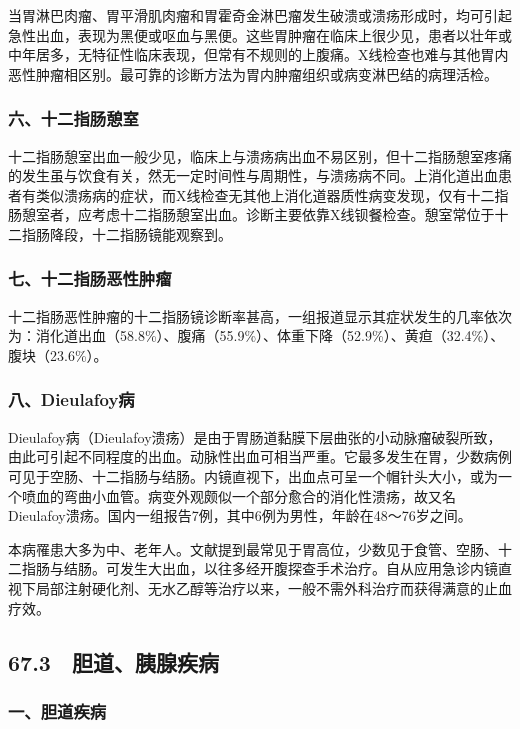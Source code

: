 当胃淋巴肉瘤、胃平滑肌肉瘤和胃霍奇金淋巴瘤发生破溃或溃疡形成时，均可引起急性出血，表现为黑便或呕血与黑便。这些胃肿瘤在临床上很少见，患者以壮年或中年居多，无特征性临床表现，但常有不规则的上腹痛。X线检查也难与其他胃内恶性肿瘤相区别。最可靠的诊断方法为胃内肿瘤组织或病变淋巴结的病理活检。

\subsubsection{六、十二指肠憩室}

十二指肠憩室出血一般少见，临床上与溃疡病出血不易区别，但十二指肠憩室疼痛的发生虽与饮食有关，然无一定时间性与周期性，与溃疡病不同。上消化道出血患者有类似溃疡病的症状，而X线检查无其他上消化道器质性病变发现，仅有十二指肠憩室者，应考虑十二指肠憩室出血。诊断主要依靠X线钡餐检查。憩室常位于十二指肠降段，十二指肠镜能观察到。

\subsubsection{七、十二指肠恶性肿瘤}

十二指肠恶性肿瘤的十二指肠镜诊断率甚高，一组报道显示其症状发生的几率依次为：消化道出血（58.8\%）、腹痛（55.9\%）、体重下降（52.9\%）、黄疸（32.4\%）、腹块（23.6\%）。

\subsubsection{八、Dieulafoy病}

Dieulafoy病（Dieulafoy溃疡）是由于胃肠道黏膜下层曲张的小动脉瘤破裂所致，由此可引起不同程度的出血。动脉性出血可相当严重。它最多发生在胃，少数病例可见于空肠、十二指肠与结肠。内镜直视下，出血点可呈一个帽针头大小，或为一个喷血的弯曲小血管。病变外观颇似一个部分愈合的消化性溃疡，故又名Dieulafoy溃疡。国内一组报告7例，其中6例为男性，年龄在48～76岁之间。

本病罹患大多为中、老年人。文献提到最常见于胃高位，少数见于食管、空肠、十二指肠与结肠。可发生大出血，以往多经开腹探查手术治疗。自从应用急诊内镜直视下局部注射硬化剂、无水乙醇等治疗以来，一般不需外科治疗而获得满意的止血疗效。

\protect\hypertarget{text00169.html}{}{}

\subsection{67.3　胆道、胰腺疾病}

\subsubsection{一、胆道疾病}

